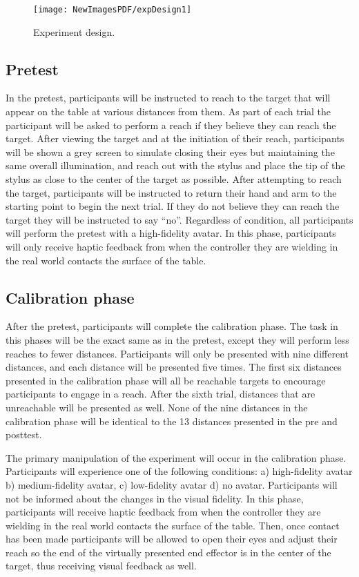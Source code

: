 \begin{figure}
	\centering
	\texttt{[image: NewImagesPDF/expDesign1]}
	\caption{Experiment design.}
	\label{fig:ProposedExpDesign}
\end{figure} 

\subsection{Pretest}
In the pretest, participants will be instructed to reach to the target that will appear on the table at various distances from them. As part of each trial the participant will be asked to perform a reach if they believe they can reach the target. After viewing the target and at the initiation of their reach, participants will be shown a grey screen to simulate closing their eyes but maintaining the same overall illumination, and reach out with the stylus and place the tip of the stylus as close to the center of the target as possible. After attempting to reach the target, participants will be instructed to return their hand and arm to the starting point to begin the next trial. If they do not believe they can reach the target they will be instructed to say “no”. Regardless of condition, all participants will perform the pretest with a high-fidelity avatar. In this phase, participants will only receive haptic feedback from when the controller they are wielding in the real world contacts the surface of the table.

\subsection{Calibration phase}
After the pretest, participants will complete the calibration phase. The task in this phases will be the exact same as in the pretest, except they will perform less reaches to fewer distances. Participants will only be presented with nine different distances, and each distance will be presented five times. The first six distances presented in the calibration phase will all be reachable targets to encourage participants to engage in a reach. After the sixth trial, distances that are unreachable will be presented as well. None of the nine distances in the calibration phase will be identical to the 13 distances presented in the pre and posttest. 

The primary manipulation of the experiment will occur in the calibration phase. Participants will experience one of the following conditions: a) high-fidelity avatar b) medium-fidelity avatar, c) low-fidelity avatar d) no avatar. Participants will not be informed about the changes in the visual fidelity. In this phase, participants will receive haptic feedback from when the controller they are wielding in the real world contacts the surface of the table. Then, once contact has been made participants will be allowed to open their eyes and adjust their reach so the end of the virtually presented end effector is in the center of the target, thus receiving visual feedback as well.

